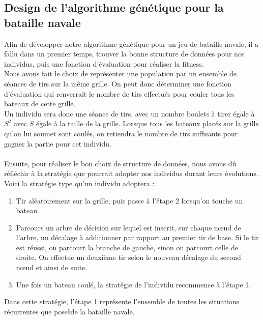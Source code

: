 \documentclass[12pt]{report}
\begin{document}
	\subsection{Design de l'algorithme génétique pour la bataille navale}
	Afin de développer notre algorithme génétique pour un jeu de bataille navale, il a fallu dans un premier temps, trouver la bonne structure de données pour nos individus, puis une fonction d'évaluation pour réaliser la fitness.\\
	Nous avons fait le choix de représenter une population par un ensemble de séances de tirs sur la même grille. On peut donc déterminer une fonction d'évaluation qui renverrait le nombre de tirs effectués pour couler tous les bateaux de cette grille.\\
	Un individu sera donc une séance de tirs, avec un nombre boulets à tirer égale à $S^2$ avec $S$ égale à la taille de la grille. Lorsque tous les bateaux placés sur la grille qu'on lui soumet sont coulés, on retiendra le nombre de tirs suffisants pour gagner la partie pour cet individu.\\\\
	Ensuite, pour réaliser le bon choix de structure de données, nous avons dû réfléchir à la stratégie que pourrait adopter nos individus durant leurs évolutions. Voici la stratégie type qu'un individu adoptera :
	\begin{enumerate}
		\item Tir aléatoirement sur la grille, puis passe à l'étape 2 lorsqu'on touche un bateau.
		\item Parcours un arbre de décision sur lequel est inscrit, sur chaque nœud de l'arbre, un décalage à additionner par rapport au premier tir de base. Si le tir est réussi, on parcourt la branche de gauche, sinon on parcourt celle de droite. On effectue un deuxième tir selon le nouveau décalage du second nœud et ainsi de suite.
		\item Une fois un bateau coulé, la stratégie de l'individu recommence à l'étape 1.
	\end{enumerate}
	Dans cette stratégie, l'étape 1 représente l'ensemble de toutes les situations récurrentes que possède la bataille navale.
\end{document}
